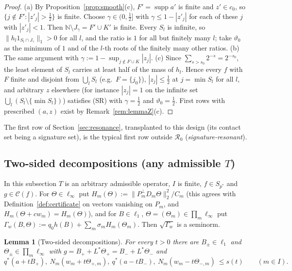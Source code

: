 \documentclass[10pt]{amsart}
\newtheorem{lemma}[theorem]{Lemma}
\theoremstyle{definition}
\theoremstyle{remark}
\newcommand{\supp}{\operatorname{supp}}
\newcommand{\N}{\mathbb N}
\newcommand{\Cset}{\mathcal C}
\begin{document}
\begin{proof}
(a) By Proposition~\ref{prop:smooth}(c), $F'=\supp a'$ is finite and
$z'\in c_0$, so $\{j\notin F':|z'_j|>\frac12\}$ is finite.  Choose
$\gamma\in(0,\frac12]$ with $\gamma\le1-|z'_j|$ for each of these $j$ with
$|z'_j|<1$.  Then $\N\setminus J_\gamma=F'\cup K'$ is finite.  Every $S_l$
is infinite, so $\|h_l1_{S_l\cap J_\gamma}\|_1>0$ for all $l$, and the
ratio is $1$ for all but finitely many $l$; take $\vartheta_0$ as the
minimum of $1$ and of the $l$-th roots of the finitely many other ratios.
(b) The same argument with $\gamma:=1-\sup_{j\notin F\cup K}|z_j|$.
(c) Since $\sum_{s>s_0}2^{-s}=2^{-s_0}$, the least element of $S_l$ carries
at least half of the mass of $h_l$.  Hence every $f$ with $F$ finite and
disjoint from $\bigcup_lS_l$ (e.g.\ $F=\{j_0\}$),
$|z_j|\le\frac12$ at $j=\min S_l$ for all $l$, and arbitrary $z$
elsewhere (for instance $|z_j|=1$ on the infinite set
$\bigcup_l(S_l\setminus\{\min S_l\})$) satisfies (SR) with $\gamma=\frac12$
and $\vartheta_0=\frac12$.  First rows with prescribed $(a,z)$ exist by
Remark~\ref{rem:lemmaZ}(c).
\end{proof}

The first row of Section~\ref{sec:resonance}, transplanted to this design
(its contact set being a signature set), is the typical first row outside
$\mathcal R_0$ (\emph{signature-resonant}).

\subsection{Two-sided decompositions (any admissible $T$)}
In this subsection $T$ is an arbitrary admissible operator, $I$ is finite,
$f\in S_{p^*}$ and $g\in\Cset(f)$.  For $\Theta\in\ell_\infty$ put
$H_m(\Theta):=\|P_m^\perp D_m\Theta\|_2^2/C_m$ (this agrees with
Definition~\ref{def:certificate} on vectors vanishing on $P_m$, and
$H_m(\Theta+cw_m)=H_m(\Theta)$), and for $B\in\ell_1$,
$\Theta=(\Theta_m)\in\prod_m\ell_\infty$ put $\Gamma_w(B,\Theta):=q_0h(B)+
\sum_m\sigma_mH_m(\Theta_m)$.  Then $\sqrt{\Gamma_w}$ is a seminorm.

\begin{lemma}[Two-sided decompositions]\label{lem:twosided}
For every $t>0$ there are $B_\pm\in\ell_1$ and $\Theta_\pm\in\prod_m
\ell_\infty$ with $g=B_++L^*\Theta_+=B_-+L^*\Theta_-$ and
\[
 q^*(a+tB_+),\ N_m(w_m+t\Theta_{+,m}),\ q^*(a-tB_-),\ N_m(w_m-t\Theta_{-,m})
 \ \le s(t)\qquad(m\in I).
\]
\end{lemma}
\end{document}

